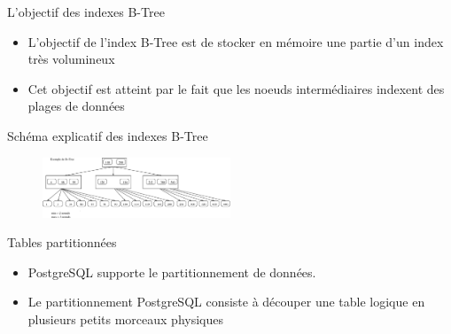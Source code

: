 
\begin{frame}[fragile]{L'objectif des indexes B-Tree}

   \begin{itemize}
      \item L'objectif de l'index B-Tree est de stocker en mémoire une partie d'un index très volumineux
      \item Cet objectif est atteint par le fait que les noeuds intermédiaires indexent des plages de données
   \end{itemize}

\end{frame}


\begin{frame}[fragile]{Schéma explicatif des indexes B-Tree}

\begin{figure}
\begin{center}
\includegraphics[angle=0, width=0.5\textwidth]{images/b_tree.eps}
\end{center}
\end{figure}

\end{frame}


\begin{frame}[fragile]{Tables partitionnées}

   \begin{itemize}
      \item PostgreSQL supporte le partitionnement de données.
      \item Le partitionnement PostgreSQL consiste à découper une table logique en plusieurs petits morceaux physiques

   \end{itemize}

\begin{toile}
\end{toile}

\end{frame}

